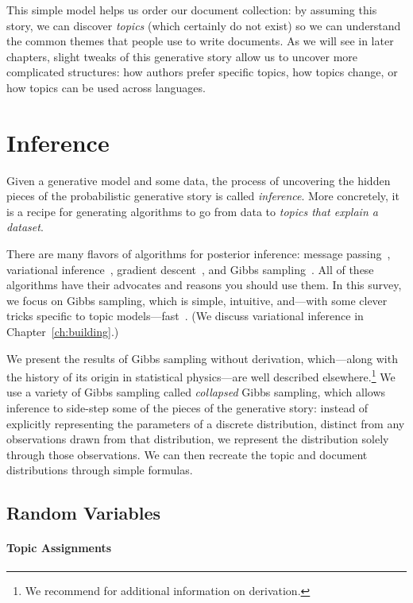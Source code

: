 This simple model helps us order our document collection: by assuming
this story, we can discover \emph{topics} (which certainly do not
exist) so we can understand the common themes that people use to write
documents.  As we will see in later chapters, slight tweaks of this
generative story allow us to uncover more complicated structures: how
authors prefer specific topics, how topics change, or how topics can
be used across languages.

\section{Inference}

Given a generative model and some data, the process of uncovering the hidden
 pieces of the probabilistic generative story is called \emph{inference}.  More
concretely, it is a recipe for generating algorithms to go from data to
\emph{topics that explain a dataset}.

There are many flavors of algorithms for posterior inference: message
passing~\citep{zeng-13}, variational inference~\citep{blei-03},
gradient descent~\citep{hoffman-10}, and Gibbs
sampling~\citep{griffiths-04}.  All of these algorithms have their
advocates and reasons you should use them.  In this survey, we focus
on Gibbs sampling, which is simple, intuitive, and---with some clever
tricks specific to topic models---fast~\citep{yao-09}.  (We discuss
variational inference in Chapter~\ref{ch:building}.)

We present the results of Gibbs sampling without derivation,
which---along with the history of its origin in statistical
physics---are well described elsewhere.\footnote{We recommend
  \citet{resnik-09} for additional information on derivation.} We use
a variety of Gibbs sampling called \emph{collapsed} Gibbs sampling,
which allows inference to side-step some of the pieces of the
generative story: instead of explicitly representing the parameters of
a discrete distribution, distinct from any observations drawn from
that distribution, we represent the distribution solely through those
observations.  We can then recreate the topic and document
distributions through simple formulas.

\subsection{Random Variables}

\paragraph{Topic Assignments}

